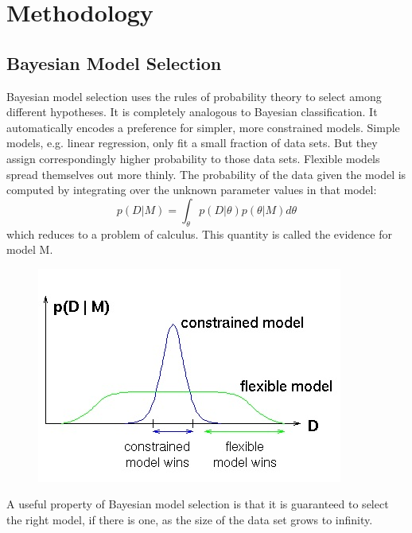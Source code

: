 \documentclass[12pt,a4paper]{article}
\begin{document}
\section{Methodology}
\subsection{Bayesian Model Selection}
Bayesian model selection uses the rules of probability theory to select among different hypotheses. It is completely analogous to Bayesian classification. It automatically encodes a preference for simpler, more constrained models. Simple models, e.g. linear regression, only fit a small fraction of data sets. But they assign correspondingly higher probability to those data sets. Flexible models spread themselves out more thinly.
The probability of the data given the model is computed by integrating over the unknown parameter values in that model:
$$ p(D|M)=\int_{\theta}p(D|\theta)p(\theta|M)d\theta $$
which reduces to a problem of calculus. This quantity is called the evidence for model M.
\begin{figure}[htp]
\centering
    \includegraphics{Bayesian model.jpg}
\end{figure}
A useful property of Bayesian model selection is that it is guaranteed to select the right model, if there is one, as the size of the data set grows to infinity.
\end{document}
